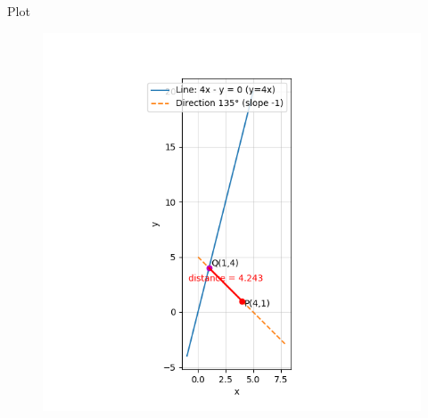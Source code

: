 \documentclass{beamer}
\begin{document}
\begin{frame}{Plot}
    \begin{figure}[H]
    \centering
    \includegraphics[width=0.6\columnwidth]{figs/Figure_1.png}
    \label{fig:1}
    \end{figure}
\end{frame}
\end{document}
